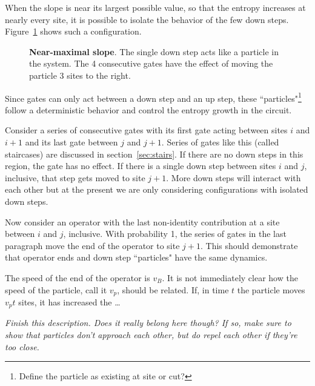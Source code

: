 When the slope is near its largest possible value, so that the entropy increases at nearly every site, it is possible to isolate the behavior of the few down steps. Figure~\ref{fig:particle} shows such a configuration.
\begin{figure}
	\centering
	
	\caption{\textbf{Near-maximal slope}. The single down step acts like a particle in the system. The 4 consecutive gates have the effect of moving the particle 3 sites to the right.}
	\label{fig:particle}
\end{figure}
Since gates can only act between a down step and an up step, these ``particles"\footnote{Define the particle as existing at site or cut?} follow a deterministic behavior and control the entropy growth in the circuit. 

Consider a series of consecutive gates with its first gate acting between sites $i$ and $i+1$ and its last gate between $j$ and $j+1$. Series of gates like this (called staircases) are discussed in section~\ref{sec:stairs}. If there are no down steps in this region, the gate has no effect. If there is a single down step between sites $i$ and $j$, inclusive, that step gets moved to site $j+1$. More down steps will interact with each other but at the present we are only considering configurations with isolated down steps. 

Now consider an operator with the last non-identity contribution at a site between $i$ and $j$, inclusive. With probability 1, the series of gates in the last paragraph move the end of the operator to site $j+1$. This should demonstrate that operator ends and down step ``particles" have the same dynamics. 

The speed of the end of the operator is $v_B$. It is not immediately clear how the speed of the particle, call it $v_p$, should be related. If, in time $t$ the particle moves $v_pt$ sites, it has increased the \dots

\emph{Finish this description. Does it really belong here though? If so, make sure to show that particles don't approach each other, but do repel each other if they're too close.}